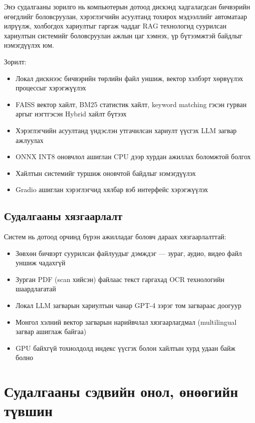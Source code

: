 \documentclass[11pt,a4paper]{article}
\begin{document}
Энэ судалгааны зорилго нь компьютерын дотоод дискэнд хадгалагдсан бичвэрийн өгөгдлийг боловсруулан, хэрэглэгчийн асуултанд тохирох мэдээллийг автоматаар илрүүлж, холбогдох хариултыг гаргаж чаддаг RAG технологид суурилсан хариултын системийг боловсруулан ажлын цаг хэмнэх, үр бүтээмжтэй байдлыг нэмэгдүүлэх юм.

Зорилт:

\begin{itemize}
    \item Локал дискнээс бичвэрийн төрлийн файл уншиж, вектор хэлбэрт хөрвүүлэх процессыг хэрэгжүүлэх
    \item FAISS вектор хайлт, BM25 статистик хайлт, keyword matching гэсэн гурван аргыг нэгтгэсэн Hybrid хайлт бүтээх
    \item Хэрэглэгчийн асуултанд үндэслэн утгачилсан хариулт үүсгэх LLM загвар ажлуулах
    \item ONNX INT8 оновчлол ашиглан CPU дээр хурдан ажиллах боломжтой болгох
    \item Хайлтын системийг туршиж оновчтой байдлыг нэмэгдүүлэх
    \item Gradio ашиглан хэрэглэгчид хялбар вэб интерфейс хэрэгжүүлэх
\end{itemize}

\subsection{Судалгааны хязгаарлалт}

Систем нь дотоод орчинд бүрэн ажилладаг боловч дараах хязгаарлалттай:

\begin{itemize}
    \item Зөвхөн бичвэрт суурилсан файлуудыг дэмждэг — зураг, аудио, видео файл уншиж чадахгүй
    \item Зурган PDF (scan хийсэн) файлаас текст гаргахад OCR технологийн шаардлагатай
    \item Локал LLM загварын хариултын чанар GPT-4 зэрэг том загвараас доогуур
    \item Монгол хэлний вектор загварын нарийвчлал хязгаарлагдмал (multilingual загвар ашиглаж байгаа)
    \item GPU байхгүй тохиолдолд индекс үүсгэх болон хайлтын хурд удаан байж болно
\end{itemize}

\newpage
\section{Судалгааны сэдвийн онол, өнөөгийн түвшин}
\end{document}
